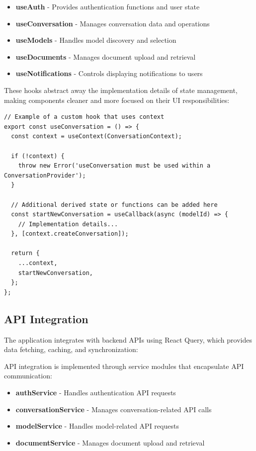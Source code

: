 \begin{itemize}
  \item \textbf{useAuth} - Provides authentication functions and user state
  \item \textbf{useConversation} - Manages conversation data and operations
  \item \textbf{useModels} - Handles model discovery and selection
  \item \textbf{useDocuments} - Manages document upload and retrieval
  \item \textbf{useNotifications} - Controls displaying notifications to users
\end{itemize}

These hooks abstract away the implementation details of state management, making components cleaner and more focused on their UI responsibilities:

\begin{verbatim}
// Example of a custom hook that uses context
export const useConversation = () => {
  const context = useContext(ConversationContext);
  
  if (!context) {
    throw new Error('useConversation must be used within a ConversationProvider');
  }
  
  // Additional derived state or functions can be added here
  const startNewConversation = useCallback(async (modelId) => {
    // Implementation details...
  }, [context.createConversation]);
  
  return {
    ...context,
    startNewConversation,
  };
};
\end{verbatim}

\subsection{API Integration}

The application integrates with backend APIs using React Query, which provides data fetching, caching, and synchronization:

\clearpage

API integration is implemented through service modules that encapsulate API communication:

\begin{itemize}
  \item \textbf{authService} - Handles authentication API requests
  \item \textbf{conversationService} - Manages conversation-related API calls
  \item \textbf{modelService} - Handles model-related API requests
  \item \textbf{documentService} - Manages document upload and retrieval
\end{itemize}

